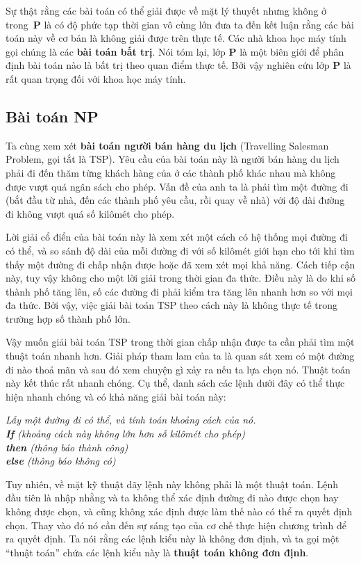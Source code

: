 Sự thật rằng các bài toán có thể giải được về mặt lý thuyết nhưng không ở
trong~$\mathbf{P}$ là có độ phức tạp thời gian vô cùng lớn đưa ta đến kết luận rằng các
bài toán này về cơ bản là không giải được trên thực tế. Các nhà khoa học máy tính gọi
chúng là các \textbf{bài toán bất trị}. Nói tóm lại, lớp $\mathbf{P}$ là một biên giới để
phân định bài toán nào là bất trị theo quan điểm thực tế. Bởi vậy nghiên cứu lớp
$\mathbf{P}$ là rất quan trọng đối với khoa học máy tính.

\subsection*{Bài toán NP}
Ta cùng xem xét \textbf{bài toán người bán hàng du lịch} (Travelling Salesman Problem, gọi
tắt là TSP). Yêu cầu của bài toán này là người bán hàng du lịch phải đi đến thăm từng
khách hàng của ở các thành phố khác nhau mà không được vượt quá ngân sách cho phép. Vấn đề
của anh ta là phải tìm một đường đi (bắt đầu từ nhà, đến các thành phố yêu cầu, rồi quay
về nhà) với độ dài đường đi không vượt quá số kilômét cho phép.

Lời giải cổ điển của bài toán này là xem xét một cách có hệ thống mọi đường đi có thể, và
so sánh độ dài của mỗi đường đi với số kilômét giới hạn cho tới khi tìm thấy một đường đi
chấp nhận được hoặc đã xem xét mọi khả năng. Cách tiếp cận này, tuy vậy không cho một lời
giải trong thời gian đa thức. Điều này là do khi số thành phố tăng lên, số các đường đi
phải kiểm tra tăng lên nhanh hơn so với mọi đa thức. Bởi vậy, việc giải bài toán TSP theo
cách này là không thực tế trong trường hợp số thành phố lớn.

Vậy muốn giải bài toán TSP trong thời gian chấp nhận được ta cần phải tìm một thuật toán
nhanh hơn. Giải pháp tham lam của ta là quan sát xem có một đường đi nào thoả mãn và sau
đó xem chuyện gì xảy ra nếu ta lựa chọn nó. Thuật toán này kết thúc rất nhanh chóng. Cụ
thể, danh sách các lệnh dưới đây có thể thực hiện nhanh chóng và có khả năng giải bài toán
này:
\begin{flushleft}
  \qquad     \textsl{Lấy một đường đi có thể, và tính toán khoảng cách của nó.} \\
  \qquad    \textsl{\textbf{If} (khoảng cách này không lớn hơn số kilômét cho phép)} \\
  \qquad    \textsl{\textbf{then} (thông báo thành công)} \\
  \qquad \textsl{\textbf{else} (thông báo không có)}
\end{flushleft}
Tuy nhiên, về mặt kỹ thuật dãy lệnh này không phải là một thuật toán. Lệnh đầu tiên là
nhập nhằng và ta không thể xác định đường đi nào được chọn hay không được chọn, và cũng
không xác định được làm thế nào có thể ra quyết định chọn. Thay vào đó nó cần đến sự sáng
tạo của cơ chế thực hiện chương trình để ra quyết định. Ta nói rằng các lệnh kiểu này là
không đơn định, và ta gọi một ``thuật toán'' chứa các lệnh kiểu này là \textbf{thuật toán
  không đơn định}.

